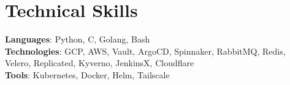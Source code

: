 \documentclass[letterpaper,11pt]{article}
\begin{document}
%
\section{Technical Skills}
 \begin{itemize}[leftmargin=0.15in, label={}]
    \small{\item{
     \textbf{Languages}{: Python, C, Golang, Bash} \\
     \textbf{Technologies}{: GCP, AWS, Vault, ArgoCD, Spinnaker, RabbitMQ, Redis, Velero, Replicated, Kyverno, JenkinsX, Cloudflare} \\
     \textbf{Tools}{: Kubernetes, Docker, Helm, Tailscale} \\
    }}
 \end{itemize}


\end{document}
